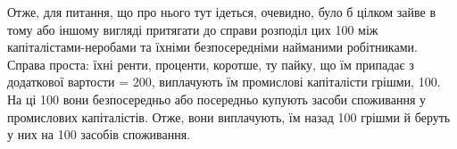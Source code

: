 Отже, для питання, що про нього тут ідеться, очевидно, було б цілком зайве в тому або іншому вигляді
притягати до справи розподіл цих 100 між капіталістами-неробами та їхніми безпосередніми
найманими робітниками. Справа проста: їхні ренти, проценти, коротше, ту пайку, що їм припадає з
додаткової вартости = 200, виплачують їм промислові капіталісти грішми, 100. На
ці 100 вони безпосередньо або посередньо купують засоби споживання у промислових
капіталістів. Отже, вони виплачують, їм назад 100 грішми й беруть у них на 100
засобів споживання.
